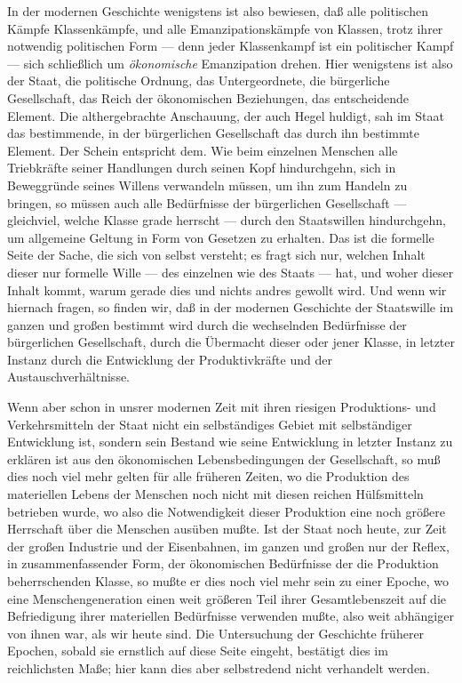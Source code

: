 In der modernen Geschichte wenigstens ist also bewiesen, daß
alle politischen Kämpfe Klassenkämpfe, und alle Emanzipationskämpfe von
Klassen, trotz ihrer notwendig politischen Form --- denn jeder
Klassenkampf ist ein politischer Kampf --- sich schließlich
um \emph{ökonomische} Emanzipation drehen. Hier wenigstens ist also der
Staat, die politische Ordnung, das Untergeordnete, die bürgerliche
Gesellschaft, das Reich der ökonomischen Beziehungen, das entscheidende
Element. Die althergebrachte Anschauung, der auch Hegel huldigt, sah im
Staat das bestimmende, in der bürgerlichen Gesellschaft das durch ihn
bestimmte Element. Der Schein entspricht dem. Wie beim einzelnen
Menschen alle Triebkräfte seiner Handlungen durch seinen Kopf
hindurchgehn, sich in Beweggründe seines Willens verwandeln müssen, um
ihn zum Handeln zu bringen, so müssen auch alle Bedürfnisse der
bürgerlichen Gesellschaft --- gleichviel, welche Klasse grade herrscht ---
durch den Staatswillen hindurchgehn, um allgemeine Geltung in Form von
Gesetzen zu erhalten. Das ist die formelle Seite der Sache, die sich von
selbst versteht; es fragt sich nur, welchen Inhalt dieser nur formelle
Wille --- des einzelnen wie des Staats --- hat, und woher dieser Inhalt
kommt, warum gerade dies und nichts andres gewollt wird. Und wenn wir
hiernach fragen, so finden wir, daß in der modernen Geschichte der
Staatswille im ganzen und großen bestimmt wird durch die wechselnden
Bedürfnisse der bürgerlichen Gesellschaft, durch die Übermacht dieser
oder jener Klasse, in letzter Instanz durch die Entwicklung der
Produktivkräfte und der Austauschverhältnisse.

Wenn aber schon in unsrer modernen Zeit mit ihren riesigen
Produktions- und Verkehrsmitteln der Staat nicht ein selbständiges
Gebiet mit selbständiger Entwicklung ist, sondern sein Bestand wie seine
Entwicklung in letzter Instanz zu erklären ist aus den ökonomischen
Lebensbedingungen der Gesellschaft, so muß dies noch viel mehr gelten
für alle früheren Zeiten, wo die Produktion des materiellen Lebens der
Menschen noch nicht mit diesen reichen Hülfsmitteln betrieben wurde, wo
also die Notwendigkeit dieser Produktion eine noch größere Herrschaft
über die Menschen ausüben mußte. Ist der Staat noch heute, zur Zeit der
großen Industrie und der Eisenbahnen, im ganzen und großen nur der
Reflex, in zusammenfassender Form, der ökonomischen Bedürfnisse der die
Produktion beherrschenden Klasse, so mußte er dies noch viel mehr sein
zu einer Epoche, wo eine Menschengeneration einen weit größeren Teil
ihrer Gesamtlebenszeit auf die Befriedigung ihrer materiellen
Bedürfnisse verwenden mußte, also weit abhängiger von ihnen war, als wir
heute sind. Die Untersuchung der Geschichte früherer Epochen, sobald sie
ernstlich auf diese Seite eingeht, bestätigt dies im reichlichsten Maße;
hier kann dies aber selbstredend nicht verhandelt werden.

